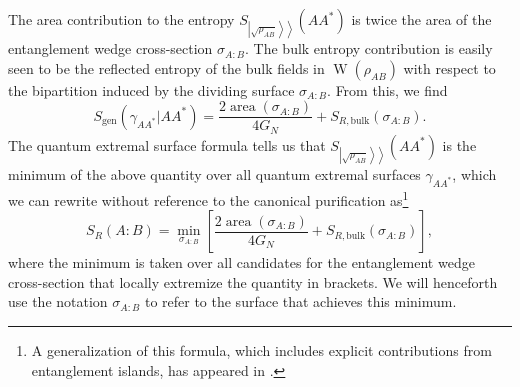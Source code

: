 \documentclass[a4paper,11pt]{article}
\newcommand{\area}{\operatorname{area}}
\newcommand{\W}{\operatorname{W}}
\newcommand{\kett}[1]{\left.\left| #1 \right\rangle \right\rangle}
\begin{document}
The area contribution to the entropy $S_{\kett{\sqrt{\rho_{AB}}}}(AA^*)$ is twice the area of the entanglement wedge cross-section $\sigma_{A:B}$. The bulk entropy contribution is easily seen to be the reflected entropy of the bulk fields in $\W(\rho_{AB})$ with respect to the bipartition induced by the dividing surface $\sigma_{A:B}$. From this, we find
\begin{equation}
    S_{\text{gen}}(\gamma_{AA^*}|AA^*)
        = \frac{2 \area(\sigma_{A:B})}{4 G_N} + S_{R, \text{bulk}}(\sigma_{A:B}).
\end{equation}
The quantum extremal surface formula tells us that $S_{\kett{\sqrt{\rho_{AB}}}}(AA^*)$ is the minimum of the above quantity over all quantum extremal surfaces $\gamma_{AA^*}$, which we can rewrite without reference to the canonical purification as\footnote{A generalization of this formula, which includes explicit contributions from entanglement islands, has appeared in \cite{reflected-entropy-islands}.}
\begin{equation} \label{eq:dutta-faulkner}
    S_R(A:B)
        = \min_{\sigma_{A:B}} \left[ \frac{2 \area(\sigma_{A:B})}{4 G_N} + S_{R, \text{bulk}}(\sigma_{A:B}) \right],
\end{equation}
where the minimum is taken over all candidates for the entanglement wedge cross-section that locally extremize the quantity in brackets. We will henceforth use the notation $\sigma_{A:B}$ to refer to the surface that achieves this minimum.
\end{document}
